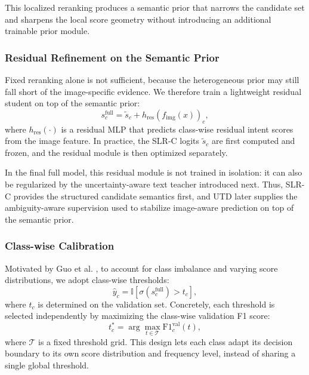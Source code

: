 This localized reranking produces a semantic prior that narrows the candidate set and sharpens the local score geometry without introducing an additional trainable prior module.

\subsubsection{Residual Refinement on the Semantic Prior}

Fixed reranking alone is not sufficient, because the heterogeneous prior may still fall short of the image-specific evidence. We therefore train a lightweight residual student on top of the semantic prior:
\begin{equation}
s^{\text{full}}_c = \tilde{s}_c + h_{\text{res}}(f_{\text{img}}(x))_c,
\end{equation}
where $h_{\text{res}}(\cdot)$ is a residual MLP that predicts class-wise residual intent scores from the image feature. In practice, the SLR-C logits $\tilde{s}_c$ are first computed and frozen, and the residual module is then optimized separately.

In the final full model, this residual module is not trained in isolation: it can also be regularized by the uncertainty-aware text teacher introduced next. Thus, SLR-C provides the structured candidate semantics first, and UTD later supplies the ambiguity-aware supervision used to stabilize image-aware prediction on top of the semantic prior.

\subsubsection{Class-wise Calibration}

Motivated by Guo et al. \cite{guo_calibration_2017}, to account for class imbalance and varying score distributions, we adopt class-wise thresholds:
\begin{equation}
\hat{y}_c = \mathbb{I}[\sigma(s^{\text{full}}_c) > t_c],
\end{equation}
where $t_c$ is determined on the validation set. Concretely, each threshold is selected independently by maximizing the class-wise validation F1 score:
\begin{equation}
t_c^\ast = \arg\max_{t \in \mathcal{T}} \text{F1}_c^{\text{val}}(t),
\end{equation}
where $\mathcal{T}$ is a fixed threshold grid. This design lets each class adapt its decision boundary to its own score distribution and frequency level, instead of sharing a single global threshold.

